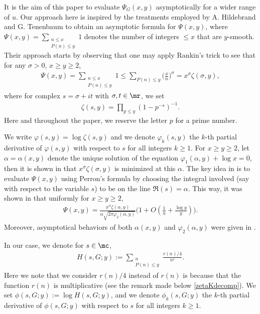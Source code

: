 \documentclass[twoside,leqno,10pt, A4]{amsart}
\begin{document}
   It is the aim of this paper to evaluate $\Psi_G(x,y)$ asymptotically for a wider range of $u$. Our approach here is inspired by the treatments employed by
A. Hildebrand and G. Tenenbaum \cite{HT86} to obtain an asymptotic formula for  $\Psi(x,y)$, where $\Psi(x,y)=\sum_{\substack{n \leq x \\ P(n) \leq y}}1$ denotes the number of integers $\leq x$ that are $y$-smooth. Their approach starts by observing that one may apply Rankin's trick to see that for any $\sigma > 0$, $x \geq y \geq 2$, 
\begin{align*}
\Psi(x,y) = \sum_{\substack{n \leq x \\ P(n) \leq y}} 1 \leq \sum_{P(n) \leq y} \biggl( \frac{x}{n} \biggr)^{\sigma} =  x^{\sigma} \zeta(\sigma, y), 
\end{align*}
   where for complex $s=\sigma+it$ with $\sigma, t \in \mr$, we set 
\begin{align*}
\zeta(s, y)=\prod_{p \leq y}(1-p^{-s})^{-1}.
\end{align*}
  Here and throughout the paper, we reserve the letter $p$ for a prime number.
 
  We write $\varphi(s,y)=\log \zeta(s, y)$ and we denote $\varphi_k(s,y)$ the $k$-th partial derivative of $\varphi(s,y)$ with respect to $s$ for all integers $k \geq 1$. For $x \geq y \geq 2$, let $\alpha=\alpha(x,y)$ denote the unique solution of the equation $\varphi_1(\alpha, y)+\log x=0$, then it is shown in \cite{HT86} that $x^{\sigma} \zeta(\sigma, y)$ is minimized at this $\alpha$. The key idea in \cite{HT86} is to evaluate $\Psi(x,y)$ using Perron's formula by choosing the integral involved (say with respect to the variable $s$) to be on the line $\Re(s)=\alpha$. This way, it was shown in \cite[Theorem 1]{HT86} that uniformly for $x \geq y \geq 2$,
\begin{align*}
\Psi(x, y)=\frac {x^{\alpha}\zeta(\alpha,y)}{\alpha\sqrt{2\pi \varphi_2(\alpha,y)}}\Big (1+ O(\frac 1u+\frac {\log y}{y}) \Big).
\end{align*}
 Moreover, asymptotical behaviors of both $\alpha(x,y)$ and $\varphi_2(\alpha,y)$ were given in \cite[Theorem 2]{HT86}.

  In our case, we denote for $s \in \mc$, 
\begin{align*}
  H(s,G;y) :=\sum_{\substack{n \\ P(n) \leq y}}\frac {r(n)/4}{n^s}. 
\end{align*}
   Here we note that we consider $r(n)/4$ instead of $r(n)$ is because that the function $r(n)$ is multiplicative (see the remark made below \eqref{zetaKdecomp}). We  set $\phi(s,G;y) :=\log H(s,G;y)$, and we denote $\phi_k(s,G;y)$ the $k$-th partial derivative of $\phi(s,G;y)$ with respect to $s$ for all integers $k \geq 1$. 
  
\end{document}
